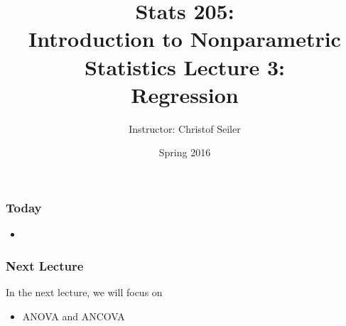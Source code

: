 \documentclass[10pt]{beamer}
\title{\large \bfseries Stats 205: \\ Introduction to Nonparametric Statistics \linebreak \linebreak \linebreak
Lecture 3: \\ Regression}
\author{Instructor: Christof Seiler}
\date{Spring 2016}
\begin{document}
\frame{
\thispagestyle{empty}
\titlepage
}

\begin{frame}
\frametitle{Today}

\begin{itemize}
\item 
\end{itemize}

\end{frame}

\begin{frame}
\frametitle{Next Lecture}

In the next lecture, we will focus on
\begin{itemize}
\item ANOVA and ANCOVA
\end{itemize}

\end{frame}
\end{document}
